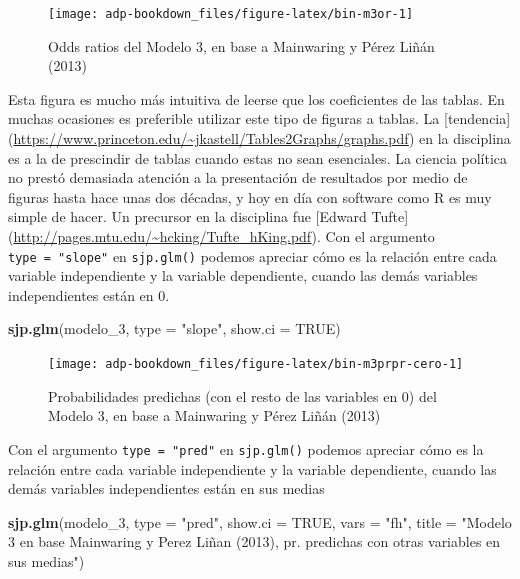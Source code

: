 \documentclass[]{book}
\newenvironment{Shaded}{\begin{snugshade}}{\end{snugshade}}
\newcommand{\KeywordTok}[1]{\textcolor[rgb]{0.13,0.29,0.53}{\textbf{#1}}}
\newcommand{\DataTypeTok}[1]{\textcolor[rgb]{0.13,0.29,0.53}{#1}}
\newcommand{\DecValTok}[1]{\textcolor[rgb]{0.00,0.00,0.81}{#1}}
\newcommand{\StringTok}[1]{\textcolor[rgb]{0.31,0.60,0.02}{#1}}
\newcommand{\OtherTok}[1]{\textcolor[rgb]{0.56,0.35,0.01}{#1}}
\newcommand{\NormalTok}[1]{#1}
\begin{document}
\begin{figure}

{\centering \texttt{[image: adp-bookdown\_files/figure-latex/bin-m3or-1]} 

}

\caption{Odds ratios del Modelo 3, en base a Mainwaring y Pérez Liñán (2013)}\label{fig:bin-m3or}
\end{figure}

Esta figura es mucho más intuitiva de leerse que los coeficientes de las
tablas. En muchas ocasiones es preferible utilizar este tipo de figuras
a tablas. La {[}tendencia{]}
(\url{https://www.princeton.edu/~jkastell/Tables2Graphs/graphs.pdf}) en
la disciplina es a la de prescindir de tablas cuando estas no sean
esenciales. La ciencia política no prestó demasiada atención a la
presentación de resultados por medio de figuras hasta hace unas dos
décadas, y hoy en día con software como R es muy simple de hacer. Un
precursor en la disciplina fue {[}Edward Tufte{]}
(\url{http://pages.mtu.edu/~hcking/Tufte_hKing.pdf}). Con el argumento
\texttt{type\ =\ "slope"} en \texttt{sjp.glm()} podemos apreciar cómo es
la relación entre cada variable independiente y la variable dependiente,
cuando las demás variables independientes están en 0.

\begin{Shaded}
\begin{Highlighting}[]
\KeywordTok{sjp.glm}\NormalTok{(modelo_}\DecValTok{3}\NormalTok{,}
        \DataTypeTok{type        =} \StringTok{"slope"}\NormalTok{,}
        \DataTypeTok{show.ci     =} \OtherTok{TRUE}\NormalTok{)}
\end{Highlighting}
\end{Shaded}

\begin{figure}

{\centering \texttt{[image: adp-bookdown\_files/figure-latex/bin-m3prpr-cero-1]} 

}

\caption{Probabilidades predichas (con el resto de las variables en 0) del Modelo 3, en base a Mainwaring y Pérez Liñán (2013)}\label{fig:bin-m3prpr-cero}
\end{figure}

Con el argumento \texttt{type\ =\ "pred"} en \texttt{sjp.glm()} podemos
apreciar cómo es la relación entre cada variable independiente y la
variable dependiente, cuando las demás variables independientes están en
sus medias

\begin{Shaded}
\begin{Highlighting}[]
\KeywordTok{sjp.glm}\NormalTok{(modelo_}\DecValTok{3}\NormalTok{, }
        \DataTypeTok{type        =} \StringTok{"pred"}\NormalTok{,}
        \DataTypeTok{show.ci     =} \OtherTok{TRUE}\NormalTok{,}
        \DataTypeTok{vars        =} \StringTok{"fh"}\NormalTok{,}
        \DataTypeTok{title       =} \StringTok{"Modelo 3 en base Mainwaring y Perez Liñan (2013), pr. predichas con otras variables en sus medias"}\NormalTok{)}
\end{Highlighting}
\end{Shaded}
\end{document}
